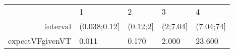 \begin{table}[ht]
\centering
\begin{tabular}{rllll}
  & 1 & 2 & 3 & 4 \\ 
 interval & (0.038;0.12] & (0.12;2] & (2;7.04] & (7.04;74] \\ 
  expectVFgivenVT &  0.011 &  0.170 &  2.000 & 23.600 \\ 
  \end{tabular}
\end{table}
